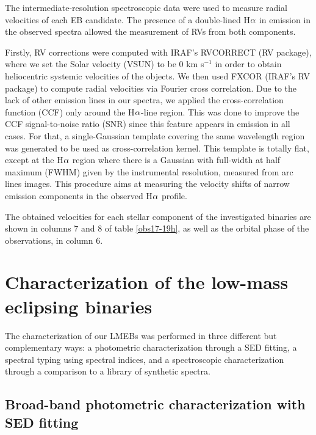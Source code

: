 \documentclass[fleqn,usenatbib]{mnras}
\begin{document}
The intermediate-resolution spectroscopic data were used to measure radial velocities of each EB candidate. The presence of a double-lined H${\rm \alpha}$ in emission in the observed spectra allowed the measurement of RVs from both components. 

Firstly, RV corrections were computed with IRAF's RVCORRECT (RV package), where we set the Solar velocity (VSUN) to be $0$ km s$^{-1}$ in order to obtain heliocentric systemic velocities of the objects. 
We then used FXCOR (IRAF's RV package) to compute radial velocities via Fourier cross correlation. Due to the lack of other emission lines in our spectra, we applied the cross-correlation function (CCF) only around the H${\rm \alpha}$-line region. This was done to improve the CCF signal-to-noise ratio (SNR) since this feature appears in emission in all cases. For that, a single-Gaussian template covering the same wavelength region was generated to be used as cross-correlation kernel. This template is totally flat, except at the H${\rm \alpha}$ region where there is a Gaussian with full-width at half maximum (FWHM) given by the instrumental resolution, measured from arc lines images. This procedure aims at measuring the velocity shifts of narrow emission components in the observed H${\rm \alpha}$ profile.

The obtained velocities for each stellar component of the investigated binaries are shown in columns 7 and 8 of table \ref{obs17-19h}, as well as the orbital phase of the observations, in column 6.


\section{Characterization of the low-mass eclipsing binaries}
\label{sec:charac}

The characterization of our LMEBs was performed in three different but complementary ways: a photometric characterization through a SED fitting, a spectral typing using spectral indices, and a spectroscopic characterization through a comparison to a library of synthetic spectra.


\subsection{Broad-band photometric characterization with SED fitting}\label{sect:sed}
\end{document}
